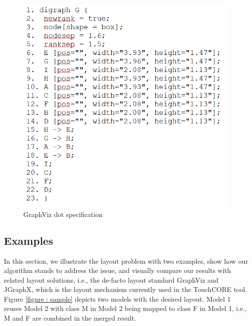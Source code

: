 \begin{figure}
	\includegraphics[width=1\linewidth]{gvDot.PNG}
	\caption{GraphViz dot specification }
	\label{gv dot}
\end{figure}
\subsection{Examples}
In this section, we illustrate the layout problem with two examples, show how our algorithm stands to address the issue, and visually compare our results with related layout solutions, i.e., the de-facto layout standard GraphViz and JGraphX, which is the layout mechanism currently used in the TouchCORE tool. Figure \ref{figure : sample} depicts two models with the desired layout. Model 1 reuses Model 2 with class M in Model 2 being mapped to class F in Model 1, i.e., M and F are combined in the merged result.

